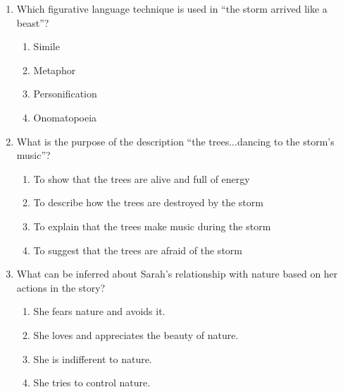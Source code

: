 \documentclass[12pt]{article}
\begin{document}
\begin{enumerate}
\vspace{0.5cm}

\item Which figurative language technique is used in “the storm arrived like a beast”?

\begin{enumerate}[label=\Alph*.]
    \item Simile
    \item Metaphor
    \item Personification
    \item Onomatopoeia
\end{enumerate}

\vspace{0.5cm}

\item What is the purpose of the description “the trees...dancing to the storm’s music”?

\begin{enumerate}[label=\Alph*.]
    \item To show that the trees are alive and full of energy
    \item To describe how the trees are destroyed by the storm
    \item To explain that the trees make music during the storm
    \item To suggest that the trees are afraid of the storm
\end{enumerate}

\vspace{0.5cm}

\item What can be inferred about Sarah’s relationship with nature based on her actions in the story?

\begin{enumerate}[label=\Alph*.]
    \item She fears nature and avoids it.
    \item She loves and appreciates the beauty of nature.
    \item She is indifferent to nature.
    \item She tries to control nature.
\end{enumerate}

\vspace{0.5cm}

\end{enumerate}
\end{document}
